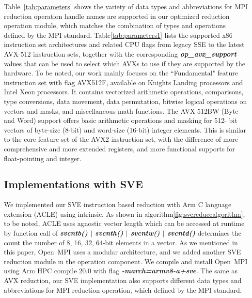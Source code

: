 \documentclass[5p,times,twocolumn]{elsarticle}
\newcommand{\ompi}[0]{Open~MPI\xspace}
\newcommand{\mpi}[0]{\textsc{MPI}\xspace}
\begin{document}
%
Table~\ref{tab:parameters} shows the variety of data types and
abbreviations for \mpi reduction operation handle names are supported
in our optimized reduction operation
module, which matches the combination of types and operations defined
by the \mpi standard.
Table\ref{tab:parameters1} lists the supported x86 instruction set
architectures and related CPU flags from legacy SSE to the latest
AVX-512 instruction sets, together with the corresponding
\emph{\textbf{\textit{op_avx_support}}} values that can be used to select
which AVXs to use if they are supported by the hardware.
To be noted, our work mainly focuses on the
``Fundamental" feature instruction set with flag AVX512F, available on
Knights Landing processors and Intel Xeon processors. It contains
vectorized arithmetic operations, comparisons, type conversions, data
movement, data permutation, bitwise logical operations on vectors and
masks, and miscellaneous math functions.
The AVX-512BW (Byte and Word) support offers basic arithmetic operations and masking for 512-
bit vectors of byte-size (8-bit) and word-size (16-bit) integer elements. This is similar to the core
feature set of the AVX2 instruction set, with the difference of more
comprehensive and more extended registers, and more functional supports for
float-pointing and integer.

\subsection{Implementations with SVE}
We implemented our SVE instruction based reduction with Arm
C language extension (ACLE) using intrinsic. As shown in algorithm\ref{fig:svereducealgorithm},
to be noted, ACLE uses agnostic vector length which can be accessed at runtime by
function call of \emph{\textbf{\textit{svcntb() $\mid$ svcnth() $\mid$ svcntw() $\mid$ svcntd()}}}
determines the count the number of 8, 16, 32, 64-bit elements in a vector.
As we mentioned in this paper, \ompi uses a modular architecture,
and we added another SVE reduction module in the operation component. We compile
and install \ompi using Arm HPC compile 20.0 with
flag \emph{\textbf{\textit{-march=armv8-a+sve}}}. The same as AVX reduction,
our SVE implementation also supports different data types and
abbreviations for \mpi reduction operation, which defined
by the \mpi standard.
\end{document}
